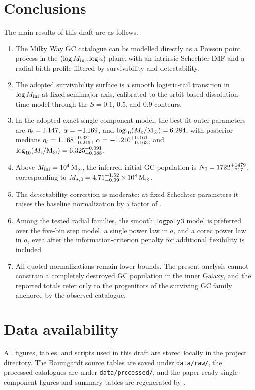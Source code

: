 \documentclass[fleqn,usenatbib]{mnras}
\begin{document}
\section{Conclusions}\label{sec:conclusion}
The main results of this draft are as follows.
\begin{enumerate}
    \item The Milky Way GC catalogue can be modelled directly as a Poisson point process in the $(\log M_{\rm ini},\log a)$ plane, with an intrinsic Schechter IMF and a radial birth profile filtered by survivability and detectability.
    \item The adopted survivability surface is a smooth logistic-tail transition in $\log M_{\rm ini}$ at fixed semimajor axis, calibrated to the orbit-based dissolution-time model through the $S=0.1$, $0.5$, and $0.9$ contours.
    \item In the adopted exact single-component model, the best-fit outer parameters are $\eta_t=1.147$, $\alpha=-1.169$, and $\log_{10}(M_c/{\rm M}_\odot)=6.284$, with posterior medians $\eta_t=1.168_{-0.216}^{+0.321}$, $\alpha=-1.210_{-0.163}^{+0.161}$, and $\log_{10}(M_c/{\rm M}_\odot)=6.325_{-0.088}^{+0.091}$.
    \item Above $M_{\rm ini}=10^4\,{\rm M}_\odot$, the inferred initial GC population is $N_0=1722_{-717}^{+1479}$, corresponding to $M_{\star,0}=4.71_{-0.99}^{+1.52}\times10^8\,{\rm M}_\odot$.
    \item The detectability correction is moderate: at fixed Schechter parameters it raises the baseline normalization by a factor of \ExactCountRatio.
    \item Among the tested radial families, the smooth $\texttt{logpoly3}$ model is preferred over the five-bin step model, a single power law in $a$, and a cored power law in $a$, even after the information-criterion penalty for additional flexibility is included.
    \item All quoted normalizations remain lower bounds. The present analysis cannot constrain a completely destroyed GC population in the inner Galaxy, and the reported totals refer only to the progenitors of the surviving GC family anchored by the observed catalogue.
\end{enumerate}

\section*{Data availability}
All figures, tables, and scripts used in this draft are stored locally in the project directory. The Baumgardt source tables are saved under \texttt{data/raw/}, the processed catalogues are under \texttt{data/processed/}, and the paper-ready single-component figures and summary tables are regenerated by .




\bsp
\label{lastpage}
\end{document}
